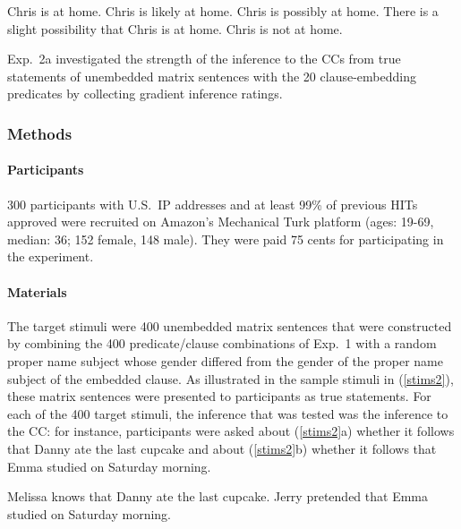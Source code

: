 \documentclass[11pt,fleqn]{article}
\newcommand{\6}{\mbox{$[\hspace*{-.6mm}[$}}
\newcommand{\9}{\mbox{$]\hspace*{-.6mm}]$}}
\begin{document}
\begin{exe}
\ex\label{chris}
\begin{xlist}
 Chris is at home.
 Chris is likely at home.
 Chris is possibly at home.
 There is a slight possibility that Chris is at home.
 Chris is not at home.
\end{xlist}
\end{exe}
Exp.~2a investigated the strength of the inference to the CCs from true statements of unembedded matrix sentences with the 20 clause-embedding predicates by collecting gradient inference ratings.

\subsubsection{Methods}

\paragraph{Participants} 300 participants with U.S.\ IP addresses and at least 99\% of previous HITs approved were recruited on Amazon's Mechanical Turk platform (ages: 19-69, median: 36; 152 female, 148 male). They were paid 75 cents for participating in the experiment.

\paragraph{Materials} The target stimuli were 400 unembedded matrix sentences that were constructed by combining the 400 predicate/clause combinations of Exp.~1 with a random proper name subject whose gender differed from the gender of the proper name subject of the embedded clause. As illustrated in the sample stimuli in (\ref{stims2}), these matrix sentences were presented to participants as true statements. For each of the 400 target stimuli, the inference that was tested was the inference to the CC: for instance, participants were asked about (\ref{stims2}a) whether it follows that Danny ate the last cupcake and about (\ref{stims2}b) whether it follows that Emma studied on Saturday morning.

\begin{exe}
\ex\label{stims2}
\begin{xlist}
 Melissa knows that Danny ate the last cupcake.
 Jerry pretended that Emma studied on Saturday morning.
\end{xlist}
\end{exe}
\end{document}
